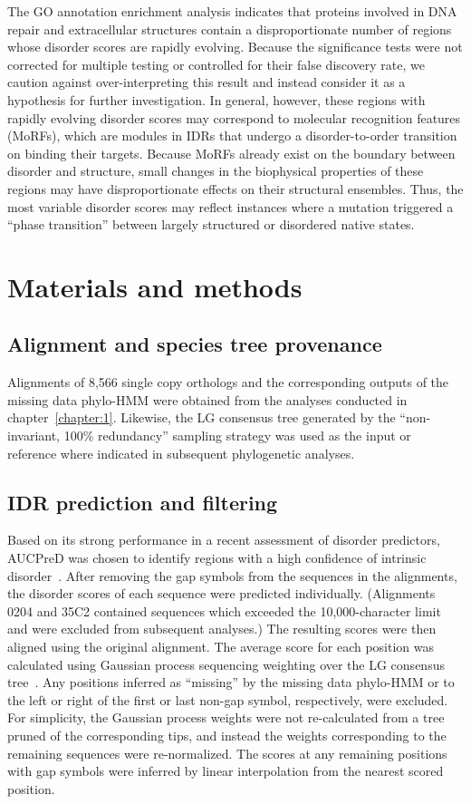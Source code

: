 The GO annotation enrichment analysis indicates that proteins involved in DNA repair and extracellular structures contain a disproportionate number of regions whose disorder scores are rapidly evolving. Because the significance tests were not corrected for multiple testing or controlled for their false discovery rate, we caution against over-interpreting this result and instead consider it as a hypothesis for further investigation. In general, however, these regions with rapidly evolving disorder scores may correspond to molecular recognition features (MoRFs), which are modules in IDRs that undergo a disorder-to-order transition on binding their targets. Because MoRFs already exist on the boundary between disorder and structure, small changes in the biophysical properties of these regions may have disproportionate effects on their structural ensembles. Thus, the most variable disorder scores may reflect instances where a mutation triggered a ``phase transition'' between largely structured or disordered native states.

\section{Materials and methods}

\subsection{Alignment and species tree provenance}
Alignments of 8,566 single copy orthologs and the corresponding outputs of the missing data phylo-HMM were obtained from the analyses conducted in chapter~\ref{chapter:1}. Likewise, the LG consensus tree generated by the ``non-invariant, 100\% redundancy'' sampling strategy was used as the input or reference where indicated in subsequent phylogenetic analyses.

\subsection{IDR prediction and filtering}
Based on its strong performance in a recent assessment of disorder predictors, AUCPreD was chosen to identify regions with a high confidence of intrinsic disorder~\cite{Wang2016, Necci2021}. After removing the gap symbols from the sequences in the alignments, the disorder scores of each sequence were predicted individually. (Alignments 0204 and 35C2 contained sequences which exceeded the 10,000-character limit and were excluded from subsequent analyses.) The resulting scores were then aligned using the original alignment. The average score for each position was calculated using Gaussian process sequencing weighting over the LG consensus tree~\cite{Altschul1989}. Any positions inferred as ``missing'' by the missing data phylo-HMM or to the left or right of the first or last non-gap symbol, respectively, were excluded. For simplicity, the Gaussian process weights were not re-calculated from a tree pruned of the corresponding tips, and instead the weights corresponding to the remaining sequences were re-normalized. The scores at any remaining positions with gap symbols were inferred by linear interpolation from the nearest scored position.

